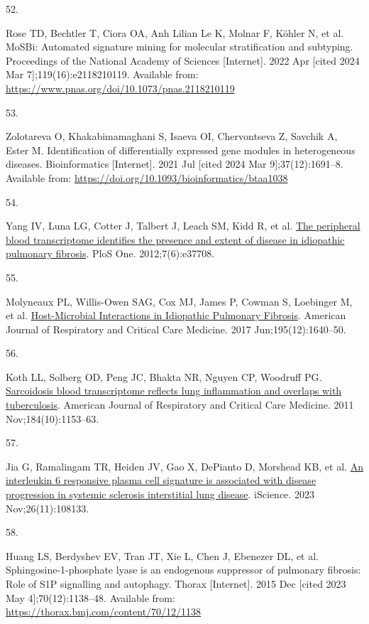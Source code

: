 \documentclass[
]{article}
\newlength{\cslhangindent}
\newlength{\csllabelwidth}
\newenvironment{CSLReferences}[2] %
 {\begin{list}{}{%
  \setlength{\itemindent}{0pt}
  \setlength{\leftmargin}{0pt}
  \setlength{\parsep}{0pt}
  \ifodd #1
   \setlength{\leftmargin}{\cslhangindent}
   \setlength{\itemindent}{-1\cslhangindent}
  \fi
  \setlength{\itemsep}{#2\baselineskip}}}
 {\end{list}}
\newcommand{\CSLLeftMargin}[1]{\parbox[t]{\csllabelwidth}{\strut#1\strut}}
\newcommand{\CSLRightInline}[1]{\parbox[t]{\linewidth - \csllabelwidth}{\strut#1\strut}}
\begin{document}
\begin{CSLReferences}{0}{1}
\CSLLeftMargin{52. }%
\CSLRightInline{Rose TD, Bechtler T, Ciora OA, Anh Lilian Le K, Molnar F, Köhler N, et al. {MoSBi}: {Automated} signature mining for molecular stratification and subtyping. Proceedings of the National Academy of Sciences {[}Internet{]}. 2022 Apr {[}cited 2024 Mar 7{]};119(16):e2118210119. Available from: \url{https://www.pnas.org/doi/10.1073/pnas.2118210119}}

\CSLLeftMargin{53. }%
\CSLRightInline{Zolotareva O, Khakabimamaghani S, Isaeva OI, Chervontseva Z, Savchik A, Ester M. Identification of differentially expressed gene modules in heterogeneous diseases. Bioinformatics {[}Internet{]}. 2021 Jul {[}cited 2024 Mar 9{]};37(12):1691--8. Available from: \url{https://doi.org/10.1093/bioinformatics/btaa1038}}

\CSLLeftMargin{54. }%
\CSLRightInline{Yang IV, Luna LG, Cotter J, Talbert J, Leach SM, Kidd R, et al. \href{https://doi.org/10.1371/journal.pone.0037708}{The peripheral blood transcriptome identifies the presence and extent of disease in idiopathic pulmonary fibrosis}. PloS One. 2012;7(6):e37708. }

\CSLLeftMargin{55. }%
\CSLRightInline{Molyneaux PL, Willis-Owen SAG, Cox MJ, James P, Cowman S, Loebinger M, et al. \href{https://doi.org/10.1164/rccm.201607-1408OC}{Host-{Microbial} {Interactions} in {Idiopathic} {Pulmonary} {Fibrosis}}. American Journal of Respiratory and Critical Care Medicine. 2017 Jun;195(12):1640--50. }

\CSLLeftMargin{56. }%
\CSLRightInline{Koth LL, Solberg OD, Peng JC, Bhakta NR, Nguyen CP, Woodruff PG. \href{https://doi.org/10.1164/rccm.201106-1143OC}{Sarcoidosis blood transcriptome reflects lung inflammation and overlaps with tuberculosis}. American Journal of Respiratory and Critical Care Medicine. 2011 Nov;184(10):1153--63. }

\CSLLeftMargin{57. }%
\CSLRightInline{Jia G, Ramalingam TR, Heiden JV, Gao X, DePianto D, Morshead KB, et al. \href{https://doi.org/10.1016/j.isci.2023.108133}{An interleukin 6 responsive plasma cell signature is associated with disease progression in systemic sclerosis interstitial lung disease}. iScience. 2023 Nov;26(11):108133. }

\CSLLeftMargin{58. }%
\CSLRightInline{Huang LS, Berdyshev EV, Tran JT, Xie L, Chen J, Ebenezer DL, et al. Sphingosine-1-phosphate lyase is an endogenous suppressor of pulmonary fibrosis: Role of {S1P} signalling and autophagy. Thorax {[}Internet{]}. 2015 Dec {[}cited 2023 May 4{]};70(12):1138--48. Available from: \url{https://thorax.bmj.com/content/70/12/1138}}


\end{CSLReferences}
\end{document}
